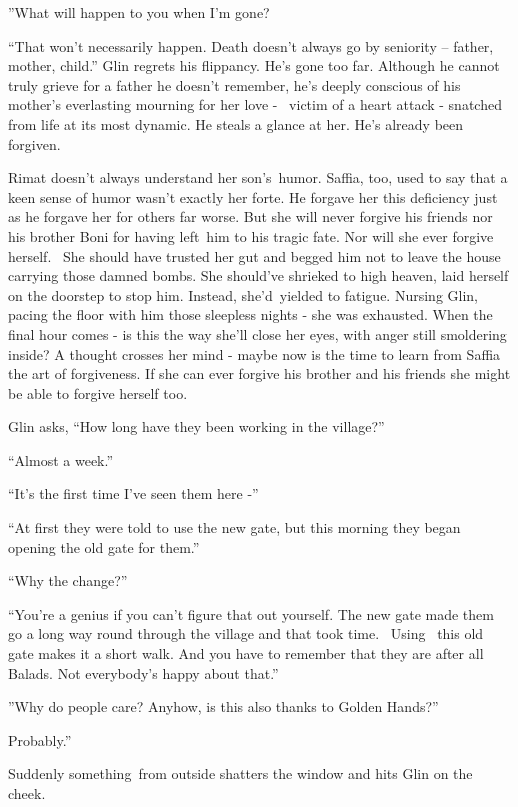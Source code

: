 \documentclass[12pt]{book}
\begin{document}
{}''What will happen to you when I'm gone?{\textquotedbl}

{}``That won't necessarily happen. Death doesn't always go by seniority -- father, mother, child.'' Glin regrets his
flippancy. He's gone too far. Although he cannot truly grieve for a father he doesn't remember, he's deeply conscious
of his mother's everlasting mourning for her love - \ victim of a heart attack - snatched from life at its most
dynamic. He steals a glance at her. He's already been forgiven.

{Rimat doesn't always understand her son's~humor. Saffia, too, used to
say that a keen sense of humor wasn't exactly her forte. }He forgave her this deficiency just as he forgave her for
others far worse. But she will never forgive his friends nor his brother Boni for having left~him to his tragic fate.
Nor will she ever forgive herself.~ She should have trusted her gut and begged him not to leave the house carrying
those damned bombs. She should've shrieked to high heaven, laid herself on the doorstep to stop him. Instead,
she'd~yielded to fatigue. Nursing Glin, pacing the floor with him those sleepless nights - she was exhausted. When the
final hour comes - is this the way she'll close her eyes, with anger still smoldering inside? A thought crosses her
mind - maybe now is the time to learn from Saffia the art of forgiveness. If she can ever forgive his brother
and{ his friends she might be able to forgive herself too. }

{Glin asks, ``How long have they been working in the village?'' }

{{}``Almost a week.'' }

{{}``It's the first time I've seen them here -'' }

{{}``}At first{ they
were told to use the new gate, but this morning they began opening the old gate for them.'' }

{{}``Why}{
}{the change?'' }

{}``You're a genius if you can't figure that out yourself. The new gate made them go a long way {round
through }the village and that took time. \ Using \ this old gate makes it a short walk. And you have to remember that
they are after all Balads. Not everybody's happy about that.''{ }

{{}''Why do people care? Anyhow, is this }also
{thanks to }Golden
Hands{?''}

{{\textquotedbl}Probably.''}

{Suddenly something~from outside shatters the window and hits Glin on
the cheek.}
\end{document}
